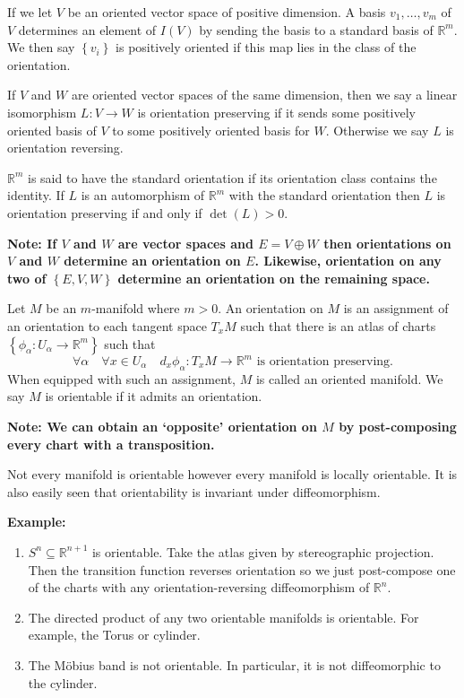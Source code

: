 \documentclass[11pt]{article}
\newcommand{\R}{\mathbb{R}}
\newenvironment{defin}
	{\begin{mdframed}[backgroundcolor=white, roundcorner=5pt, linewidth=1pt, linecolor=RoyalBlue]
		\setlength{\parindent}{0pt}}
	{\end{mdframed}}
\newcommand{\mdf}[1]{{\color{RoyalBlue} #1}}
\newenvironment{note}
	{\begin{mdframed}[backgroundcolor=white, linecolor=RubineRed, roundcorner=5pt, linewidth=1pt]\bfseries{Note:}\normalfont
	\setlength{\parindent}{0pt}}
	{\end{mdframed}}
\newenvironment{eg}
	{\begin{mdframed}[backgroundcolor=mylg,roundcorner=5pt,linewidth=0pt]\bfseries{Example:}\normalfont
	\setlength{\parindent}{0pt}}
	{\end{mdframed}}
\begin{document}
If we let $V$ be an oriented vector space of positive dimension.
A basis $v_1, \dots , v_m$ of $V$ determines an element of $I(V)$ by sending the basis to a standard basis of $\R^m$.
We then say $\left\{ v_i\right\}$ is \mdf{positively oriented} if this map lies in the class of the orientation.

If $V$ and $W$ are oriented vector spaces of the same dimension, then we say a linear isomorphism $L: V \to W$ is \mdf{orientation preserving} if it sends some positively oriented basis of $V$ to some positively oriented basis for $W$.
Otherwise we say $L$ is \mdf{orientation reversing}.

$\R^m$ is said to have the \mdf{standard orientation} if its orientation class contains the identity.
If $L$ is an automorphism of $\R^m$ with the standard orientation then $L$ is orientation preserving if and only if $\det(L) >0$.

\begin{note}
If $V$ and $W$ are vector spaces and $E= V \oplus W$ then orientations on $V$ and $W$ determine an orientation on $E$.
Likewise, orientation on any two of $\left\{ E, V, W\right\}$ determine an orientation on the remaining space.
\end{note}

\begin{defin}
Let $M$ be an $m$-manifold where $m>0$.
An \mdf{orientation} on $M$ is an assignment of an orientation to each tangent space $T_xM$ such that there is an atlas of charts $\left\{ \phi_\alpha : U_\alpha \to \R^m\right\}$ such that
\[
	\forall \alpha \quad \forall x\in U_\alpha \quad d_x\phi_\alpha:T_xM \to \R^m\text{ is orientation preserving.}
\]
When equipped with such an assignment, $M$ is called an \mdf{oriented manifold}.
We say $M$ is \mdf{orientable} if it admits an orientation.
\end{defin}

\begin{note}
We can obtain an `opposite' orientation on $M$ by post-composing every chart with a transposition.
\end{note}

Not every manifold is orientable however every manifold is locally orientable.
It is also easily seen that orientability is invariant under diffeomorphism.

\begin{eg}
	\begin{enumerate}
		\item $S^n \subseteq \R^{n+1}$ is orientable.
			Take the atlas given by stereographic projection.
			Then the transition function reverses orientation so we just post-compose one of the charts with any orientation-reversing diffeomorphism of $\R^n$.
		\item The directed product of any two orientable manifolds is orientable.
			For example, the Torus or cylinder.
		\item The M\"obius band is not orientable.
			In particular, it is not diffeomorphic to the cylinder.
	\end{enumerate}
\end{eg}
\end{document}
